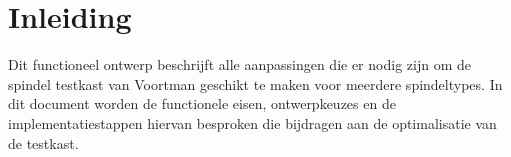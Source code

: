 \section{Inleiding}

Dit functioneel ontwerp beschrijft alle aanpassingen die er nodig zijn om de spindel testkast van Voortman geschikt te maken voor meerdere spindeltypes. In dit document worden de functionele eisen, ontwerpkeuzes en de implementatiestappen hiervan besproken die bijdragen aan de optimalisatie van de testkast.